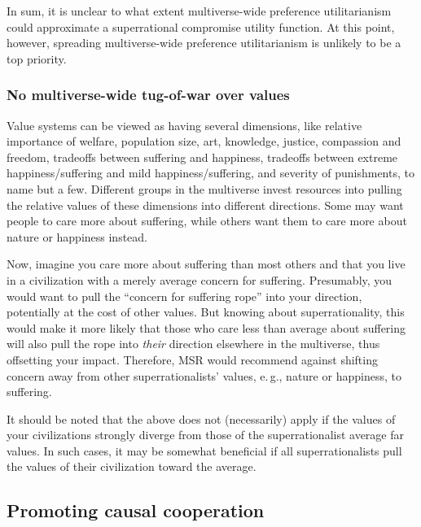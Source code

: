 In sum, it is unclear to what extent multiverse-wide preference
utilitarianism could approximate a superrational compromise utility
function. At this point, however, spreading multiverse-wide preference
utilitarianism is unlikely to be a top priority.

\subsubsection{No multiverse-wide tug-of-war over
values}\label{no-multiverse-wide-tug-of-war-over-values}

Value systems can be viewed as having several dimensions, like relative
importance of welfare, population size, art, knowledge, justice,
compassion and freedom, tradeoffs between suffering and happiness,
tradeoffs between extreme happiness/suffering and mild
happiness/suffering, and severity of punishments, to name but a few.
Different groups in the multiverse invest resources into pulling the
relative values of these dimensions into different directions. Some may
want people to care more about suffering, while others want them to care
more about nature or happiness instead.

Now, imagine you care more about suffering than most others and that you
live in a civilization with a merely average concern for suffering.
Presumably, you would want to pull the ``concern for suffering rope''
into your direction, potentially at the cost of other values. But
knowing about superrationality, this would make it more likely that
those who care less than average about suffering will also pull the rope
into \emph{their} direction elsewhere in the multiverse, thus offsetting
your impact. Therefore, MSR would recommend against shifting concern
away from other superrationalists' values, e.\,g., nature or happiness, to
suffering.

It should be noted that the above does not (necessarily) apply if the
values of your civilizations strongly diverge from those of the
superrationalist average far values. In such cases, it may be somewhat
beneficial if all superrationalists pull the values of their
civilization toward the average.

\subsection{Promoting causal
cooperation}\label{promoting-causal-cooperation}

